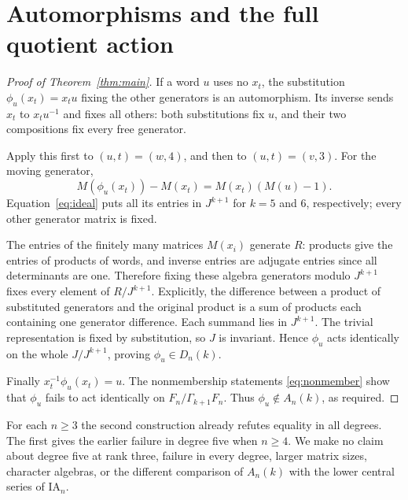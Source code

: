 \documentclass[11pt,letterpaper]{article}
\begin{document}
\section{Automorphisms and the full quotient action}
\begin{proof}[Proof of Theorem~\ref{thm:main}]
If a word $u$ uses no $x_t$, the substitution $\phi_u(x_t)=x_tu$ fixing
the other generators is an automorphism. Its inverse sends $x_t$ to
$x_tu^{-1}$ and fixes all others: both substitutions fix $u$, and their
two compositions fix every free generator.

Apply this first to $(u,t)=(w,4)$, and then to $(u,t)=(v,3)$.
For the moving generator,
\[
 M(\phi_u(x_t))-M(x_t)=M(x_t)(M(u)-1).
\]
Equation~\eqref{eq:ideal} puts all its entries in $J^{k+1}$ for $k=5$
and $6$, respectively; every other generator matrix is fixed.

The entries of the finitely many matrices $M(x_i)$ generate $R$:
products give the entries of products of words, and inverse entries are
adjugate entries since all determinants are one. Therefore fixing these
algebra generators modulo $J^{k+1}$ fixes every element of $R/J^{k+1}$.
Explicitly, the difference between a product of substituted generators and
the original product is a sum of products each containing one generator
difference. Each summand lies in $J^{k+1}$. The trivial representation is
fixed by substitution, so $J$ is invariant. Hence $\phi_u$ acts identically
on the whole $J/J^{k+1}$, proving $\phi_u\in D_n(k)$.

Finally $x_t^{-1}\phi_u(x_t)=u$. The nonmembership statements
\eqref{eq:nonmember} show that $\phi_u$ fails to act identically on
$F_n/\Gamma_{k+1}F_n$. Thus $\phi_u\notin A_n(k)$, as required.
\end{proof}

For each $n\geq3$ the second construction already refutes equality in all
degrees. The first gives the earlier failure in degree five when $n\geq4$.
We make no claim about degree five at rank three, failure in every degree,
larger matrix sizes, character algebras, or the different comparison of
$A_n(k)$ with the lower central series of $\mathrm{IA}_n$.
\end{document}
